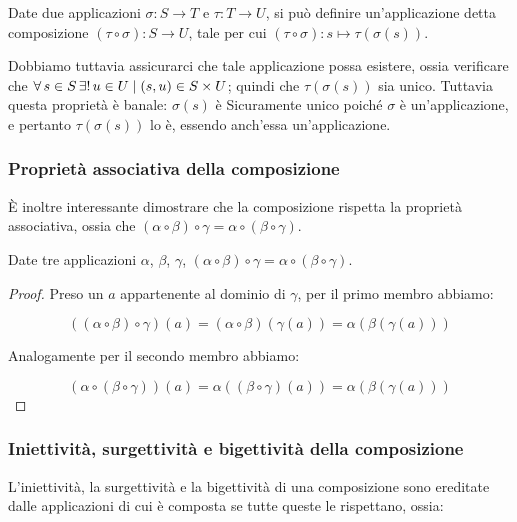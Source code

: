 \begin{definition}[Composizione]
    Date due applicazioni $\sigma : S \to T$ e
    $\tau : T \to U$, si può definire
    un'applicazione detta composizione
    $(\tau \circ \sigma) : S \to U$, tale per cui
    $(\tau \circ \sigma) : s \mapsto \tau(\sigma(s))$.
\end{definition}

Dobbiamo tuttavia assicurarci che tale applicazione
possa esistere, ossia verificare che $\forall s \in S \existsone
    u \in U \mid (s, u) \in S \times U$; quindi che $\tau(\sigma(s))$
sia unico. Tuttavia questa proprietà è banale: $\sigma(s)$ è Sicuramente
unico poiché $\sigma$ è un'applicazione, e pertanto $\tau(\sigma(s))$ lo è,
essendo anch'essa un'applicazione.

\subsubsection{Proprietà associativa della composizione}

È inoltre interessante dimostrare che la composizione rispetta la proprietà associativa,
ossia che $(\alpha \circ \beta) \circ \gamma = \alpha \circ (\beta \circ \gamma)$.

\begin{lemma}
    Date tre applicazioni $\alpha$, $\beta$, $\gamma$,
    $(\alpha \circ \beta) \circ \gamma = \alpha \circ (\beta \circ \gamma)$.
\end{lemma}

\begin{proof}
    Preso un $a$ appartenente al dominio di $\gamma$, per il primo membro abbiamo:

    $$((\alpha \circ \beta) \circ \gamma)(a) = (\alpha \circ \beta)(\gamma(a)) =
        \alpha(\beta(\gamma(a)))$$

    Analogamente per il secondo membro abbiamo:

    $$(\alpha \circ (\beta \circ \gamma))(a) = \alpha((\beta \circ \gamma)(a)) =
        \alpha(\beta(\gamma(a)))$$
\end{proof}

\subsubsection{Iniettività, surgettività e bigettività della composizione}

L'iniettività, la surgettività e la bigettività di una composizione sono
ereditate dalle applicazioni di cui è composta se tutte queste le rispettano, ossia:

